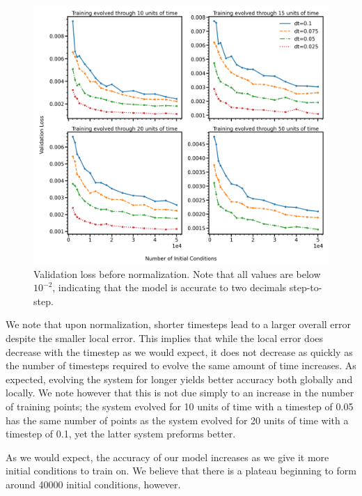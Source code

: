 \documentclass[11pt]{article} %
\numberwithin{equation}{section}  %
\begin{document}
\begin{figure}
	\centering
	
	\includegraphics[width=\linewidth]{figures/nonnorm_val_loss}
	\caption{Validation loss before normalization.  Note that all values are below $10^{-2}$, indicating that the model is accurate to two decimals step-to-step.}\label{nonnorm_val_loss}
\end{figure}

\begin{multicols}{2}

We note that upon normalization, shorter timesteps lead to a larger overall error despite the smaller local error.  This implies that while the local error does decrease with the timestep as we would expect, it does not decrease as quickly as the number of timesteps required to evolve the same amount of time increases.  As expected, evolving the system for longer yields better accuracy both globally and locally.  We note however that this is not due simply to an increase in the number of training points; the system evolved for 10 units of time with a timestep of 0.05 has the same number of points as the system evolved for 20 units of time with a timestep of 0.1, yet the latter system preforms better.  

As we would expect, the accuracy of our model increases as we give it more initial conditions to train on.  We believe that there is a plateau beginning to form around 40000 initial conditions, however. 

\end{multicols}
\end{document}

